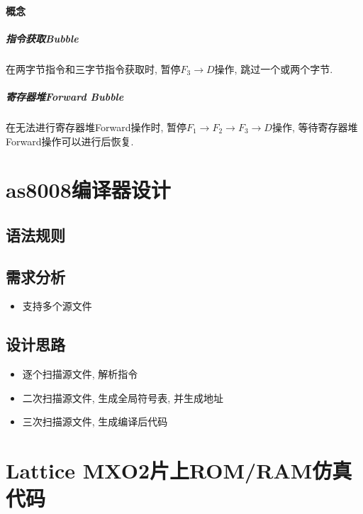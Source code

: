 \documentclass[10pt]{book}
\begin{document}
\subsubsection{概念}
\paragraph{指令获取Bubble}
在两字节指令和三字节指令获取时, 暂停$F_{3}\rightarrow D$操作, 跳过一个或两个字节.

\paragraph{寄存器堆Forward Bubble}
在无法进行寄存器堆Forward操作时, 暂停$F_{1}\rightarrow F_{2}\rightarrow F_{3}\rightarrow D$操作, 等待寄存器堆Forward操作可以进行后恢复.



\chapter{as8008编译器设计}
\section{语法规则}

\section{需求分析}
\begin{itemize}
  \item 支持多个源文件
\end{itemize}

\section{设计思路}
\begin{itemize}
  \item 逐个扫描源文件, 解析指令
  \item 二次扫描源文件, 生成全局符号表, 并生成地址
  \item 三次扫描源文件, 生成编译后代码
\end{itemize}

\appendix
\chapter{Lattice MXO2片上ROM/RAM仿真代码}
\end{document}
